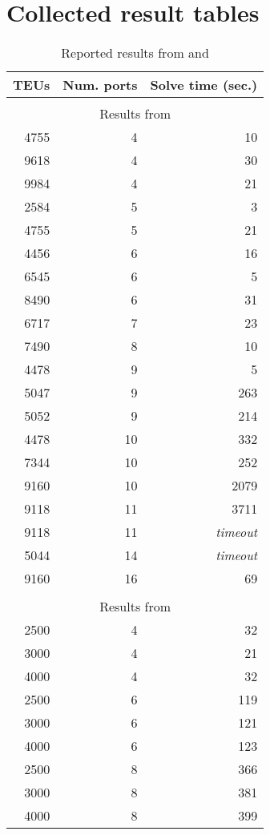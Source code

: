 \documentclass[preprint,12pt,authoryear]{elsarticle}
\begin{document}
\section{Collected result tables}
\label{app:result_tables}
\begin{table}[!h]
    \centering
    \small
    \begin{tabular}{rrr}
        TEUs	&	Num. ports	&	Solve time (sec.)	\\\hline\\
       \multicolumn{3}{c}{Results from \cite{Pacino2011FastVessels}}\\\hline
       4755	&	4	&	10	\\
       9618	&	4	&	30	\\
       9984	&	4	&	21	\\
       2584	&	5	&	3	\\
       4755	&	5	&	21	\\
       4456	&	6	&	16	\\
       6545	&	6	&	5	\\
       8490	&	6	&	31	\\
       6717	&	7	&	23	\\
       7490	&	8	&	10	\\
       4478	&	9	&	5	\\
       5047	&	9	&	263	\\
       5052	&	9	&	214	\\
       4478	&	10	&	332	\\
       7344	&	10	&	252	\\
       9160	&	10	&	2079	\\
       9118	&	11	&	3711	\\
       9118	&	11	&	{\em timeout}	\\
       5044	&	14	&	{\em timeout}	\\
       9160	&	16	&	69	\\\hline\\
       \multicolumn{3}{c}{Results from \cite{Kang2002StowageTransportation}}\\\hline
       2500	&	4	&	32	\\
       3000	&	4	&	21	\\
       4000	&	4	&	32	\\
       2500	&	6	&	119	\\
       3000	&	6	&	121	\\
       4000	&	6	&	123	\\
       2500	&	8	&	366	\\
       3000	&	8	&	381	\\
       4000	&	8	&	399	\\\hline
   \end{tabular}
    \caption{Reported results from \cite{Pacino2011FastVessels} and \cite{Kang2002StowageTransportation}}
    \label{tab:mutli_port_full_problem_results}
\end{table}\clearpage
\end{document}
